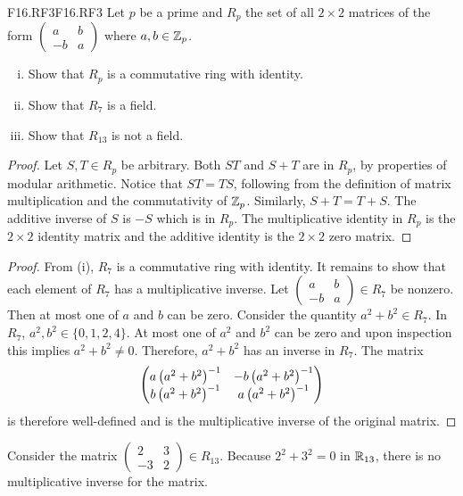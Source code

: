 \documentclass[../../AlgebraQualSolutions.tex]{subfiles}
\begin{document}
\begin{prob}{F16.RF3}{F16.RF3}
    Let $p$ be a prime and $R_p$ the set of all $2 \times 2$ matrices of the form $\begin{pmatrix} a & b\\ -b & a\end{pmatrix}$ where $a,b \in \mathbb{Z}_p$.

    \begin{enumerate}[(i)]
        \item Show that $R_p$ is a commutative ring with identity.
        \item Show that $R_7$ is a field.
        \item Show that $R_{13}$ is not a field.
    \end{enumerate}
\end{prob}

\begin{proof}
    Let $S,T \in R_p$ be arbitrary. Both $ST$ and $S + T$ are in $R_p$, by properties of modular arithmetic. Notice that $ST = TS$, following from the definition of matrix multiplication and the commutativity of $\mathbb{Z}_p$. Similarly, $S + T = T + S$. The additive inverse of $S$ is $-S$ which is in $R_p$. The multiplicative identity in $R_p$ is the $2 \times 2$ identity matrix and the additive identity is the $2 \times 2$ zero matrix.
\end{proof}

\begin{proof}
    From (i), $R_7$ is a commutative ring with identity. It remains to show that each element of $R_7$ has a multiplicative inverse. Let $\begin{pmatrix} a & b\\ -b & a\end{pmatrix} \in R_7$ be nonzero. Then at most one of $a$ and $b$ can be zero. Consider the quantity $a^2 + b^2 \in R_7$. In $R_7$, $a^2,b^2 \in \{0, 1, 2, 4\}$. At most one of $a^2$ and $b^2$ can be zero and upon inspection this implies $a^2 + b^2 \neq 0$. Therefore, $a^2 + b^2$ has an inverse in $R_7$. The matrix 
        \[\begin{pmatrix}
            a \left(a^2 + b^2\right)^{-1} & -b \left(a^2 + b^2\right)^{-1}\\
            b\left(a^2 + b^2\right)^{-1} & a\left(a^2 + b^2\right)^{-1}
        \end{pmatrix}\]
    is therefore well-defined and is the multiplicative inverse of the original matrix.
\end{proof}

\begin{solution}
    Consider the matrix $\begin{pmatrix} 2 & 3\\ -3 & 2\end{pmatrix} \in R_{13}$. Because $2^2 + 3^2 = 0$ in $\mathbb{R}_{13}$, there is no multiplicative inverse for the matrix.
\end{solution}
\end{document}
